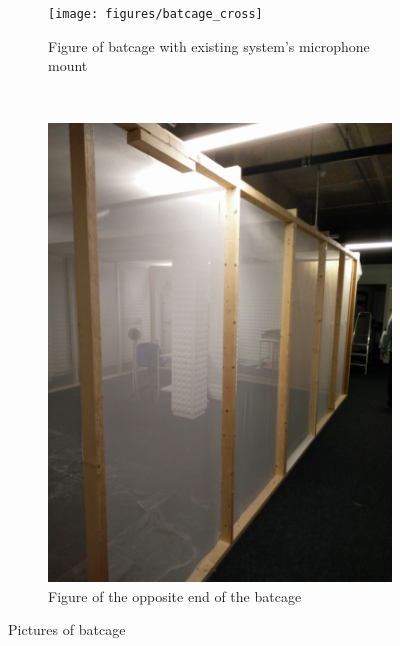 \begin{figure}[!h]
    \centering
    \begin{subfigure}[b]{0.45\textwidth}
        \texttt{[image: figures/batcage\_cross]}
        \caption{Figure of batcage with existing system's microphone mount}
        \label{fig:gull}
    \end{subfigure}
    ~ %
    \begin{subfigure}[b]{0.45\textwidth}
        \includegraphics[width=\textwidth]{figures/batcage}
        \caption{Figure of the opposite end of the batcage}
        \label{fig:mouse}
    \end{subfigure}
    \caption{Pictures of batcage}\label{fig:animals}
\end{figure}



